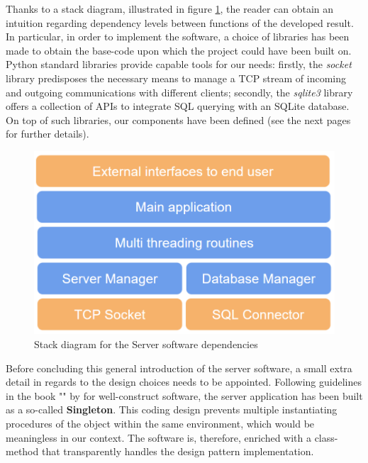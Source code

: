 \newpage
Thanks to a stack diagram, illustrated in figure \ref{fig:SE_stack_server}, the reader can obtain an intuition regarding dependency levels between functions of the developed result. In particular, in order to implement the software, a choice of libraries has been made to obtain the base-code upon which the project could have been built on. Python standard libraries provide capable tools for our needs: firstly, the \textit{socket} library predisposes the necessary means to manage a TCP stream of incoming and outgoing communications with different clients; secondly, the \textit{sqlite3} library offers a collection of APIs to integrate SQL querying with an SQLite database. On top of such libraries, our components have been defined (see the next pages for further details).

\begin{figure}[ht]
    \centering
    \includegraphics[scale=0.5]{images/SE_server_stack.PNG}
    \caption{Stack diagram for the Server software dependencies}
    \label{fig:SE_stack_server}
\end{figure}

\medskip
Before concluding this general introduction of the server software, a small extra detail in regards to the design choices needs to be appointed. Following guidelines in the book "" by \textcite{gamma1995design} for well-construct software, the server application has been built as a so-called \textbf{Singleton}. This coding design prevents multiple instantiating procedures of the object within the same environment, which would be meaningless in our context. The software is, therefore, enriched with a class-method that transparently handles the design pattern implementation.

\vspace{0.5cm}

\vspace{0.5cm}

\vspace{0.5cm}

